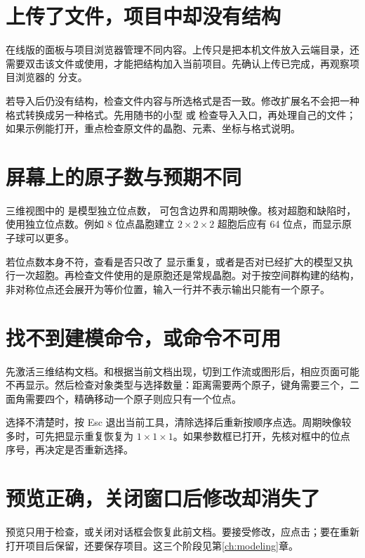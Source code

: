 \section{上传了文件，项目中却没有结构}

在线版的面板与项目浏览器管理不同内容。上传只是把本机文件放入云端目录，还需要双击该文件或使用，才能把结构加入当前项目。先确认上传已完成，再观察项目浏览器的  分支。

若导入后仍没有结构，检查文件内容与所选格式是否一致。修改扩展名不会把一种格式转换成另一种格式。先用随书的小型 \mbox{} 或 \mbox{} 检查导入入口，再处理自己的文件；如果示例能打开，重点检查原文件的晶胞、元素、坐标与格式说明。

\section{屏幕上的原子数与预期不同}

三维视图中的  是模型独立位点数， 可包含边界和周期映像。核对超胞和缺陷时，使用独立位点数。例如 8 位点晶胞建立 $2\times2\times2$ 超胞后应有 64 位点，而显示原子球可以更多。

若位点数本身不符，查看是否只改了  显示重复，或者是否对已经扩大的模型又执行一次超胞。再检查文件使用的是原胞还是常规晶胞。对于按空间群构建的结构，非对称位点还会展开为等价位置，输入一行并不表示输出只能有一个原子。

\section{找不到建模命令，或命令不可用}

先激活三维结构文档。和根据当前文档出现，切到工作流或图形后，相应页面可能不再显示。然后检查对象类型与选择数量：距离需要两个原子，键角需要三个，二面角需要四个，精确移动一个原子则应只有一个位点。

选择不清楚时，按 Esc 退出当前工具，清除选择后重新按顺序点选。周期映像较多时，可先把显示重复恢复为 $1\times1\times1$。如果参数框已打开，先核对框中的位点序号，再决定是否重新选择。

\section{预览正确，关闭窗口后修改却消失了}

预览只用于检查，或关闭对话框会恢复此前文档。要接受修改，应点击；要在重新打开项目后保留，还要保存项目。这三个阶段见第\ref{ch:modeling}章。

